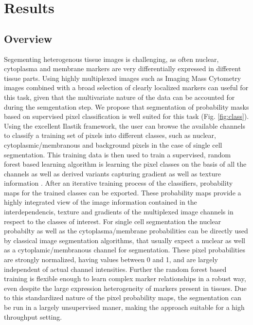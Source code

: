 \documentclass[a4paper]{article}
\begin{document}
\section{Results}
\subsection{Overview}
Segementing heterogenous tissue images is challenging, as often nuclear, cytoplasma and membrane markers are very
differentially expressed in different tissue parts. Using highly multiplexed images such as Imaging
Mass Cytometry images combined with a broad selection of clearly localized markers can useful for
this task, given that the multivariate nature of the data can be accounted for during the
semgentation step. We propose that segmentation of probability masks based on supervised pixel
classification is well suited for this task (Fig. \ref{fig:class}). Using the excellent Ilastik framework, the user
can browse the available channels to classify a training set of pixels into different classes, such
as nuclear, cytoplasmic/membranous and background pixels in the case of single cell segmentation.
This training data is then used to train a supervised, random forest based learning
algorithm is learning the pixel classes on the basis of all the channels as well as derived variants capturing
gradient as well as texture information \cite{sommer_ilastik:_2011}. After an iterative training process of the
 classifiers, probability maps for the trained classes can be
exported. These probability maps provide a highly integrated view of the image information contained in the
interdependencis, texture and gradients of the multiplexed image channels in respect to the classes
of interest. For single cell segmentation the nuclear probabilty as well as the cytoplasma/membrane
probabilities can be directly used by classical image segmentation algorithms, that usually expect
a nuclear as well as a cytoplamic/membranous channel for segmentation. These pixel probabilities
are strongly normalized, having values between 0 and 1, and are largely independent of actual
channel intensities. Further the random forest based training is flexible enough to learn complex marker
relationships in a robust way, even despite the large expression heterogeneity of markers present
in tissues.
Due to this standardized nature of the pixel probability maps, the segmentation can be run in a largely unsupervised maner,
making the approach suitable for a high throughput setting.
\end{document}
